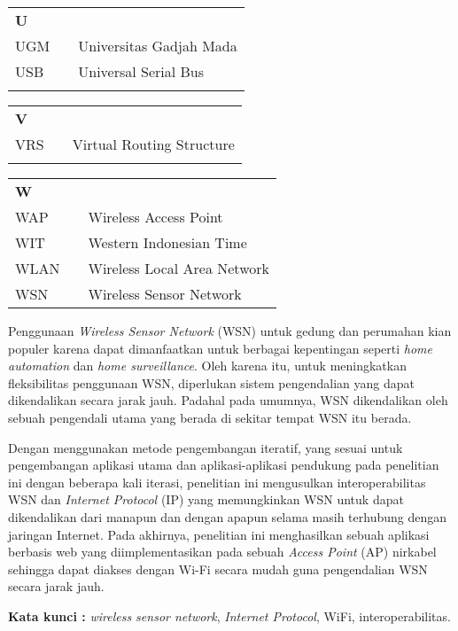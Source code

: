 \documentclass{jtetiskripsi}
\begin{document}
\begin{tabular}{p{20pt}p{3pt}l}
\textbf{U}\\
UGM & & Universitas Gadjah Mada\\
USB & & Universal Serial Bus\\
\\
\end{tabular}

\begin{tabular}{p{20pt}p{3pt}l}
\textbf{V}\\
VRS & & Virtual Routing Structure\\
\\
\end{tabular}

\begin{tabular}{p{20pt}p{3pt}l}
\textbf{W}\\
WAP & & Wireless Access Point\\
WIT & & Western Indonesian Time\\
WLAN & & Wireless Local Area Network\\
WSN & & Wireless Sensor Network\\
\end{tabular}

\begin{abstractind}
Penggunaan \emph{Wireless Sensor Network} (WSN) untuk gedung dan perumahan kian populer karena dapat dimanfaatkan untuk berbagai kepentingan seperti \emph{home automation} dan \emph{home surveillance}. Oleh karena itu, untuk meningkatkan fleksibilitas penggunaan WSN, diperlukan sistem pengendalian yang dapat dikendalikan secara jarak jauh. Padahal pada umumnya, WSN dikendalikan oleh sebuah pengendali utama yang berada di sekitar tempat WSN itu berada.

Dengan menggunakan metode pengembangan iteratif, yang sesuai untuk pengembangan aplikasi utama dan aplikasi-aplikasi pendukung pada penelitian ini dengan beberapa kali iterasi, penelitian ini mengusulkan interoperabilitas WSN dan \emph{Internet Protocol} (IP) yang memungkinkan WSN untuk dapat dikendalikan dari manapun dan dengan apapun selama masih terhubung dengan jaringan Internet. Pada akhirnya, penelitian ini menghasilkan sebuah aplikasi berbasis web yang diimplementasikan pada sebuah \emph{Access Point} (AP) nirkabel sehingga dapat diakses dengan Wi-Fi secara mudah guna pengendalian WSN secara jarak jauh.


\bigskip
\noindent
\textbf{Kata kunci :} \emph{wireless sensor network}, \emph{Internet Protocol}, WiFi, interoperabilitas.
\end{abstractind}
\end{document}
